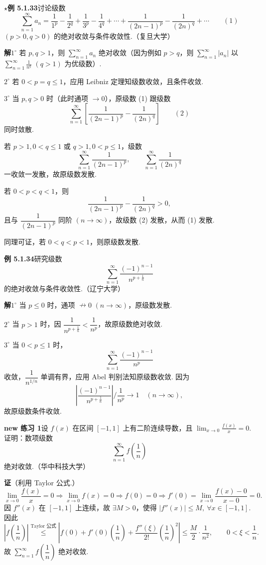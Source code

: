 \documentclass[UTF8, 12pt, fontset=fandol, oneside]{ctexart}
\begin{document}
\noindent\textbf{$\star$例 5.1.33}\quad 讨论级数
\[
  \sum_{n=1}^{\infty}a_n
  =\frac1{1^p}-\frac1{2^q}+\frac1{3^p}-\frac1{4^q}
  +\cdots+\frac1{(2n-1)^p}-\frac1{(2n)^q}+\cdots
\qquad(1)
\]
$(p>0,q>0)$ 的绝对收敛与条件收敛性.（复旦大学）

\noindent\textbf{解}\quad $1^\circ$ 若 $p,q>1$，则 $\displaystyle\sum_{n=1}^{\infty}a_n$ 绝对收敛（因为例如 $p>q$，则 $\displaystyle\sum_{n=1}^{\infty}|a_n|$ 以 $\displaystyle\sum_{n=1}^{\infty}\frac1{n^q}$ $(q>1)$ 为优级数）.

$2^\circ$ 若 $0<p=q\le1$，应用 Leibniz 定理知级数收敛，且条件收敛.

$3^\circ$ 当 $p,q>0$ 时（此时通项 $\to0$），原级数 (1) 跟级数
\[
  \sum_{n=1}^{\infty}\left[\frac1{(2n-1)^p}-\frac1{(2n)^q}\right]
\qquad(2)
\]
同时敛散.

若 $p>1,0<q\le1$ 或 $q>1,0<p\le1$，级数
\[
  \sum_{n=1}^{\infty}\frac1{(2n-1)^p},\qquad
  \sum_{n=1}^{\infty}\frac1{(2n)^q}
\]
一收敛一发散，故原级数发散.

若 $0<p<q<1$，则
\[
  \frac1{(2n-1)^p}-\frac1{(2n)^q}>0,
\]
且与 $\dfrac1{(2n-1)^p}$ 同阶 $(n\to\infty)$，故级数 (2) 发散，从而 (1) 发散.

同理可证，若 $0<q<p<1$，则原级数发散.

\noindent\textbf{例 5.1.34}\quad 研究级数
\[
  \sum_{n=1}^{\infty}\frac{(-1)^{n-1}}{n^{p+\frac1n}}
\]
的绝对收敛与条件收敛性.（辽宁大学）

\noindent\textbf{解}\quad $1^\circ$ 当 $p\le0$ 时，通项 $\nrightarrow0$ $(n\to\infty)$，原级数发散.

$2^\circ$ 当 $p>1$ 时，因 $\dfrac1{n^{p+\frac1n}}<\dfrac1{n^p}$，故原级数绝对收敛.

$3^\circ$ 当 $0<p\le1$ 时，
\[
  \sum_{n=1}^{\infty}\frac{(-1)^{n-1}}{n^p}
\]
收敛，$\dfrac1{n^{1/n}}$ 单调有界，应用 Abel 判别法知原级数收敛. 因为
\[
  \left|\frac{(-1)^{n-1}}{n^{p+\frac1n}}\right|\bigg/\frac1{n^p}\to1\quad(n\to\infty),
\]
故原级数条件收敛.

\noindent\textbf{new 练习 1}\quad 设 $f(x)$ 在区间 $[-1,1]$ 上有二阶连续导数，且 $\displaystyle\lim_{x\to0}\frac{f(x)}x=0$. 证明：数项级数
\[
  \sum_{n=1}^{\infty}f\left(\frac1n\right)
\]
绝对收敛.（华中科技大学）

\noindent\textbf{证}\quad （利用 Taylor 公式.）
\[
  \lim_{x\to0}\frac{f(x)}x=0
  \Rightarrow \lim_{x\to0}f(x)=0\Rightarrow f(0)=0
  \Rightarrow f'(0)=\lim_{x\to0}\frac{f(x)-0}{x-0}=0.
\]
因 $f''(x)$ 在 $[-1,1]$ 上连续，故 $\exists M>0$，使得
$|f''(x)|\le M,\ \forall x\in[-1,1]$. 因此
\[
  \left|f\left(\frac1n\right)\right|
  \stackrel{\text{Taylor 公式}}{\le}
  \left|f(0)+f'(0)\left(\frac1n\right)
  +\frac{f''(\xi)}{2!}\left(\frac1n\right)^2\right|
  \le\frac M2\cdot\frac1{n^2},
  \qquad 0<\xi<\frac1n.
\]
故 $\displaystyle\sum_{n=1}^{\infty}f\left(\dfrac1n\right)$ 绝对收敛.
\end{document}
